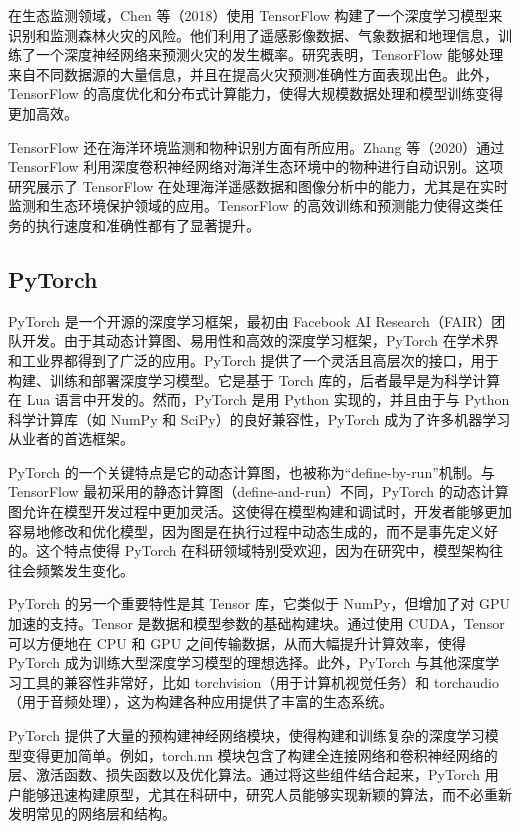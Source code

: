 \documentclass[AutoFakeBold]{LZUThesis-PgD&PhD}
\begin{document}
	在生态监测领域，Chen 等（2018）使用 TensorFlow 构建了一个深度学习模型来识别和监测森林火灾的风险\cite{chen2018}。他们利用了遥感影像数据、气象数据和地理信息，训练了一个深度神经网络来预测火灾的发生概率。研究表明，TensorFlow 能够处理来自不同数据源的大量信息，并且在提高火灾预测准确性方面表现出色。此外，TensorFlow 的高度优化和分布式计算能力，使得大规模数据处理和模型训练变得更加高效。
	
	TensorFlow 还在海洋环境监测和物种识别方面有所应用。Zhang 等（2020）通过 TensorFlow 利用深度卷积神经网络对海洋生态环境中的物种进行自动识别\cite{zhang2020}。这项研究展示了 TensorFlow 在处理海洋遥感数据和图像分析中的能力，尤其是在实时监测和生态环境保护领域的应用。TensorFlow 的高效训练和预测能力使得这类任务的执行速度和准确性都有了显著提升。
	\subsection{PyTorch}
	
	PyTorch 是一个开源的深度学习框架，最初由 Facebook AI Research（FAIR）团队开发。由于其动态计算图、易用性和高效的深度学习框架，PyTorch 在学术界和工业界都得到了广泛的应用。PyTorch 提供了一个灵活且高层次的接口，用于构建、训练和部署深度学习模型。它是基于 Torch 库的，后者最早是为科学计算在 Lua 语言中开发的。然而，PyTorch 是用 Python 实现的，并且由于与 Python 科学计算库（如 NumPy 和 SciPy）的良好兼容性，PyTorch 成为了许多机器学习从业者的首选框架。
	
	PyTorch 的一个关键特点是它的动态计算图，也被称为“define-by-run”机制。与 TensorFlow 最初采用的静态计算图（define-and-run）不同，PyTorch 的动态计算图允许在模型开发过程中更加灵活。这使得在模型构建和调试时，开发者能够更加容易地修改和优化模型，因为图是在执行过程中动态生成的，而不是事先定义好的。这个特点使得 PyTorch 在科研领域特别受欢迎，因为在研究中，模型架构往往会频繁发生变化。
	
	PyTorch 的另一个重要特性是其 Tensor 库，它类似于 NumPy，但增加了对 GPU 加速的支持。Tensor 是数据和模型参数的基础构建块。通过使用 CUDA，Tensor 可以方便地在 CPU 和 GPU 之间传输数据，从而大幅提升计算效率，使得 PyTorch 成为训练大型深度学习模型的理想选择。此外，PyTorch 与其他深度学习工具的兼容性非常好，比如 torchvision（用于计算机视觉任务）和 torchaudio（用于音频处理），这为构建各种应用提供了丰富的生态系统。
	
	PyTorch 提供了大量的预构建神经网络模块，使得构建和训练复杂的深度学习模型变得更加简单。例如，torch.nn 模块包含了构建全连接网络和卷积神经网络的层、激活函数、损失函数以及优化算法。通过将这些组件结合起来，PyTorch 用户能够迅速构建原型，尤其在科研中，研究人员能够实现新颖的算法，而不必重新发明常见的网络层和结构。
	
\end{document}
